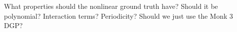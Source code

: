 \documentclass[mnsc,blindrev]{informs3}
\begin{document}
\begin{outline}[enumerate]

\1	What properties should the nonlinear ground truth have?
    \2	Should it be polynomial? Interaction terms? Periodicity?
    \2	Should we just use the Monk 3 DGP?



\end{outline}





\newpage
\end{document}
